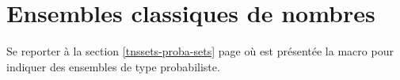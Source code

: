 \documentclass[12pt,a4paper]{article}
\begin{document}
\section{Ensembles classiques de nombres}

Se reporter à la section
\ref{tnssets-proba-sets} page \pageref{tnssets-proba-sets}
où est présentée la  macro  pour indiquer des ensembles de type probabiliste.
\end{document}
